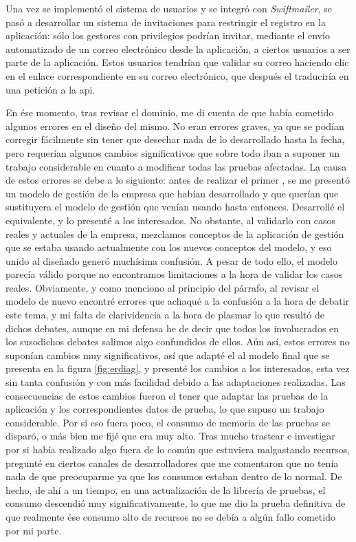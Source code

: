 Una vez se implementó el sistema de usuarios y se integró con \textit{Swiftmailer},
se pasó a desarrollar un sistema de invitaciones para restringir el registro en la
aplicación: sólo los gestores con privilegios podrían invitar, mediante el envío
automatizado de un correo electrónico desde la aplicación, a ciertos usuarios a ser
parte de la aplicación. Estos usuarios tendrían que validar su correo haciendo clic en
el enlace correspondiente en su correo electrónico, que después el 
traduciría en una petición a la \gls{api}.

En ése momento, tras revisar el dominio, me di cuenta de que había cometido algunos
errores en el diseño del mismo. No eran errores graves, ya que se podían corregir
fácilmente sin tener que desechar nada de lo desarrollado hasta la fecha, pero requerían
algunos cambios significativos que sobre todo iban a suponer un trabajo considerable
en cuanto a modificar todas las pruebas afectadas. La causa de estos errores se debe a lo siguiente:
antes de realizar el primer ,
se me presentó un modelo de gestión de la empresa que habían desarrollado y que querían
que sustituyera el modelo de gestión que venían usando hasta entonces. Desarrollé el
 equivalente, y lo presenté a los interesados.
No obstante, al validarlo con casos reales y actuales de la empresa, mezclamos conceptos
de la aplicación de gestión que se estaba usando actualmente con los nuevos conceptos del modelo,
y eso unido al  diseñado generó muchísima confusión.
A pesar de todo ello, el modelo parecía válido porque no encontramos limitaciones a la hora
de validar los casos reales. Obviamente, y como menciono al principio del párrafo, al revisar
el modelo de nuevo encontré errores que achaqué a la confusión a la hora de debatir este tema,
y mi falta de clarividencia a la hora de plasmar lo que resultó de dichos
debates, aunque en mi defensa he de decir que todos los involucrados en los susodichos debates
salimos algo confundidos de ellos. Aún así, estos errores no suponían cambios muy
significativos, así que adapté el  al modelo
final que se presenta en la figura \ref{fig:erdiag}, y presenté los cambios a los interesados,
esta vez sin tanta confusión y con más facilidad debido a las adaptaciones realizadas. Las
consecuencias de estos cambios fueron el tener que adaptar las pruebas de la aplicación y los
correspondientes datos de prueba, lo que supuso un trabajo considerable. Por si eso fuera poco,
el consumo de memoria de las pruebas se disparó, o más bien me fijé que era muy alto. Tras
mucho trastear e investigar por si había realizado algo fuera de lo común que estuviera
malgastando recursos, pregunté en ciertos canales de desarrolladores que me comentaron que
no tenía nada de que preocuparme ya que los consumos estaban dentro de lo normal. De hecho,
de ahí a un tiempo, en una actualización de la librería de pruebas, el consumo descendió muy
significativamente, lo que me dio la prueba definitiva de que realmente ése consumo alto de
recursos no se debía a algún fallo cometido por mi parte.

